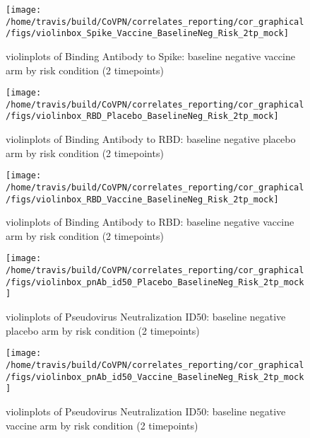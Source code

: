 \documentclass[]{book}
\theoremstyle{definition}
\theoremstyle{definition}
\theoremstyle{definition}
\newcommand{\1}{\mathbbm{1}}
\begin{document}
\clearpage
\begin{figure}[H]

{\centering \texttt{[image: /home/travis/build/CoVPN/correlates\_reporting/cor\_graphical/figs/violinbox\_Spike\_Vaccine\_BaselineNeg\_Risk\_2tp\_mock]} 

}

\caption{violinplots of Binding Antibody to Spike: baseline negative vaccine arm by risk condition (2 timepoints)}\label{fig:unnamed-chunk-100}
\end{figure}

\clearpage
\begin{figure}[H]

{\centering \texttt{[image: /home/travis/build/CoVPN/correlates\_reporting/cor\_graphical/figs/violinbox\_RBD\_Placebo\_BaselineNeg\_Risk\_2tp\_mock]} 

}

\caption{violinplots of Binding Antibody to RBD: baseline negative placebo arm by risk condition (2 timepoints)}\label{fig:unnamed-chunk-101}
\end{figure}

\clearpage
\begin{figure}[H]

{\centering \texttt{[image: /home/travis/build/CoVPN/correlates\_reporting/cor\_graphical/figs/violinbox\_RBD\_Vaccine\_BaselineNeg\_Risk\_2tp\_mock]} 

}

\caption{violinplots of Binding Antibody to RBD: baseline negative vaccine arm by risk condition (2 timepoints)}\label{fig:unnamed-chunk-102}
\end{figure}

\clearpage
\begin{figure}[H]

{\centering \texttt{[image: /home/travis/build/CoVPN/correlates\_reporting/cor\_graphical/figs/violinbox\_pnAb\_id50\_Placebo\_BaselineNeg\_Risk\_2tp\_mock]} 

}

\caption{violinplots of Pseudovirus Neutralization ID50: baseline negative placebo arm by risk condition (2 timepoints)}\label{fig:unnamed-chunk-103}
\end{figure}

\clearpage
\begin{figure}[H]

{\centering \texttt{[image: /home/travis/build/CoVPN/correlates\_reporting/cor\_graphical/figs/violinbox\_pnAb\_id50\_Vaccine\_BaselineNeg\_Risk\_2tp\_mock]} 

}

\caption{violinplots of Pseudovirus Neutralization ID50: baseline negative vaccine arm by risk condition (2 timepoints)}\label{fig:unnamed-chunk-104}
\end{figure}
\end{document}
